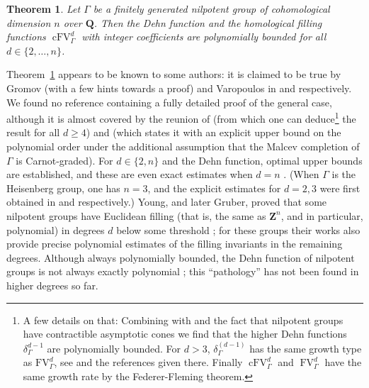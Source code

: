 \documentclass[12pt]{amsart}
\newtheorem{thm}[prop]{Theorem}
\theoremstyle{definition}
\begin{document}
\begin{thm}
\label{prop:high-nil-fill}
    Let $\Gamma$ be a finitely generated nilpotent group of cohomological dimension $n$ over $\mathbf Q$.
    Then the Dehn function and the homological filling functions $\operatorname{cFV}^d_\Gamma$ with integer coefficients are polynomially bounded for all $d \in \{2, \ldots, n\}$.
\end{thm}

Theorem~\ref{prop:high-nil-fill} appears to be known to some authors: it is claimed to be true by Gromov (with a few hints towards a proof) and Varopoulos in \cite[p.72]{GromovAI} and \cite[p.59]{Varopoulos} respectively. We found no reference containing a fully detailed proof of the general case, although it is almost covered by the reunion of \cite[Corollary 7.2]{RileyHC} (from which one can deduce\footnote{A few details on that: Combining \cite[Corollary 7.2]{RileyHC} with \cite[Theorem 4]{YoungFillNil} and the fact that nilpotent groups have contractible asymptotic cones \cite{PanCBN} we find that the higher Dehn functions $\delta^{d-1}_{\Gamma}$ are polynomially bounded. For $d>3$, $\delta_\Gamma^{(d-1)}$ has the same growth type as $\mathrm{{FV}}_\Gamma^d$, see \cite[p.19206]{ABDYDehn} and the references given there. Finally $\operatorname{cFV}_\Gamma^d$ and $ \operatorname{FV}_\Gamma^d$ have the same growth rate by the Federer-Fleming theorem.} the result for all $d\geqslant 4$) and \cite{WengerAsRank} (which states it with an explicit upper bound on the polynomial order under the additional assumption that the Malcev completion of $\Gamma$ is Carnot-graded). For $d \in \{2, n\}$ and the Dehn function, optimal upper bounds are established, and these are even exact estimates when $d=n$ \cite{GHR, WengerAsRank, CSCIsop}. (When $\Gamma$ is the Heisenberg group, one has $n=3$, and the explicit estimates for $d=2,3$ were first obtained in \cite{MR1161694} and \cite{MR676380} respectively.)
Young, and later Gruber, proved that some nilpotent groups have Euclidean filling (that is, the same as $\mathbf Z^n$, and in particular, polynomial) in degrees $d$ below some threshold \cite{YoungFillNil,MR3472846,MR4002271,MR3982578}; for these groups their works also provide precise polynomial estimates of the filling invariants in the remaining degrees. Although always polynomially bounded, the Dehn function of nilpotent groups is not always exactly polynomial \cite{MR2783380}; this ``pathology'' has not been found in higher degrees so far.

\end{document}
